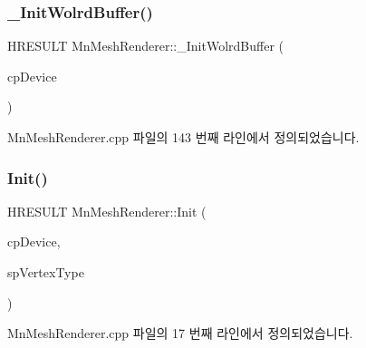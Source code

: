 \subsubsection{\texorpdfstring{\+\_\+\+Init\+Wolrd\+Buffer()}{\_InitWolrdBuffer()}}
{\footnotesize\ttfamily H\+R\+E\+S\+U\+LT Mn\+Mesh\+Renderer\+::\+\_\+\+Init\+Wolrd\+Buffer (\begin{DoxyParamCaption}\item[{const \hyperlink{namespace_m_n_l_a1eec210db8f309a4a9ac0d9658784c31}{C\+P\+D3\+D\+Device} \&}]{cp\+Device }\end{DoxyParamCaption})\hspace{0.3cm}{\ttfamily [private]}}



Mn\+Mesh\+Renderer.\+cpp 파일의 143 번째 라인에서 정의되었습니다.

\mbox{\label{class_m_n_l_1_1_mn_mesh_renderer_ab2f41c8498de2a4470ebbc1adc7e8987}} 
\subsubsection{\texorpdfstring{Init()}{Init()}}
{\footnotesize\ttfamily H\+R\+E\+S\+U\+LT Mn\+Mesh\+Renderer\+::\+Init (\begin{DoxyParamCaption}\item[{const \hyperlink{namespace_m_n_l_a1eec210db8f309a4a9ac0d9658784c31}{C\+P\+D3\+D\+Device} \&}]{cp\+Device,  }\item[{const std\+::shared\+\_\+ptr$<$ \hyperlink{class_m_n_l_1_1_mn_custom_vertex_type}{Mn\+Custom\+Vertex\+Type} $>$ \&}]{sp\+Vertex\+Type }\end{DoxyParamCaption})}



Mn\+Mesh\+Renderer.\+cpp 파일의 17 번째 라인에서 정의되었습니다.

\mbox{\label{class_m_n_l_1_1_mn_mesh_renderer_a0c83bc2682917b4504794b510574e320}} 
